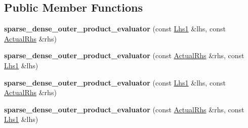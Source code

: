 \subsection*{Public Member Functions}
\begin{DoxyCompactItemize}
\item 
\mbox{\label{struct_eigen_1_1internal_1_1sparse__dense__outer__product__evaluator_a56283b61a79ec466676cf293a9dbabd5}} 
{\bfseries sparse\+\_\+dense\+\_\+outer\+\_\+product\+\_\+evaluator} (const \hyperlink{class_eigen_1_1internal_1_1_tensor_lazy_evaluator_writable}{Lhs1} \&lhs, const \hyperlink{class_eigen_1_1internal_1_1_tensor_lazy_evaluator_writable}{Actual\+Rhs} \&rhs)
\item 
\mbox{\label{struct_eigen_1_1internal_1_1sparse__dense__outer__product__evaluator_a5efbe051be702e03c39efe9df66424d1}} 
{\bfseries sparse\+\_\+dense\+\_\+outer\+\_\+product\+\_\+evaluator} (const \hyperlink{class_eigen_1_1internal_1_1_tensor_lazy_evaluator_writable}{Actual\+Rhs} \&rhs, const \hyperlink{class_eigen_1_1internal_1_1_tensor_lazy_evaluator_writable}{Lhs1} \&lhs)
\item 
\mbox{\label{struct_eigen_1_1internal_1_1sparse__dense__outer__product__evaluator_a56283b61a79ec466676cf293a9dbabd5}} 
{\bfseries sparse\+\_\+dense\+\_\+outer\+\_\+product\+\_\+evaluator} (const \hyperlink{class_eigen_1_1internal_1_1_tensor_lazy_evaluator_writable}{Lhs1} \&lhs, const \hyperlink{class_eigen_1_1internal_1_1_tensor_lazy_evaluator_writable}{Actual\+Rhs} \&rhs)
\item 
\mbox{\label{struct_eigen_1_1internal_1_1sparse__dense__outer__product__evaluator_a5efbe051be702e03c39efe9df66424d1}} 
{\bfseries sparse\+\_\+dense\+\_\+outer\+\_\+product\+\_\+evaluator} (const \hyperlink{class_eigen_1_1internal_1_1_tensor_lazy_evaluator_writable}{Actual\+Rhs} \&rhs, const \hyperlink{class_eigen_1_1internal_1_1_tensor_lazy_evaluator_writable}{Lhs1} \&lhs)
\end{DoxyCompactItemize}
